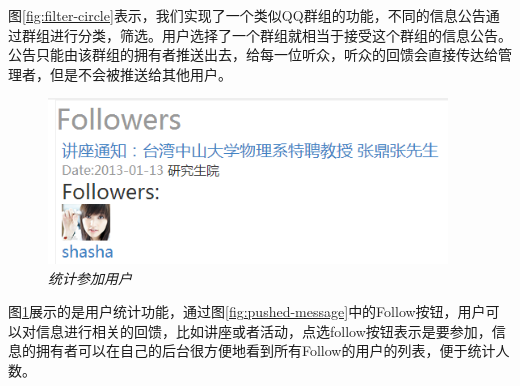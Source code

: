 \documentclass[a4paper]{ctexart}
\begin{document}
    \par 图\ref{fig:filter-circle}表示，我们实现了一个类似QQ群组的功能，不同的信息公告通过群组进行分类，筛选。用户选择了一个群组就相当于接受这个群组的信息公告。 公告只能由该群组的拥有者推送出去，给每一位听众，听众的回馈会直接传达给管理者，但是不会被推送给其他用户。
    \begin{figure}[]
        \centering
        \includegraphics[width=300pt]{followers.png}
        \caption{\small \sl 统计参加用户}
        \label{fig:follow-message}
    \end{figure}
    \par 图\ref{fig:follow-message}展示的是用户统计功能，通过图\ref{fig:pushed-message}中的Follow按钮，用户可以对信息进行相关的回馈，比如讲座或者活动，点选follow按钮表示是要参加，信息的拥有者可以在自己的后台很方便地看到所有Follow的用户的列表，便于统计人数。
    
\end{document}
